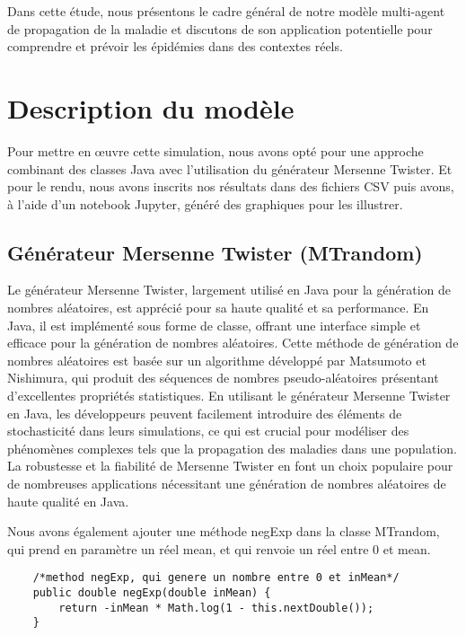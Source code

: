 \documentclass[french]{article}
\begin{document}
Dans cette étude, nous présentons le cadre général de notre modèle multi-agent de propagation de la maladie et discutons de son application potentielle pour comprendre et prévoir les épidémies dans des contextes réels.

\section{Description du modèle}

Pour mettre en œuvre cette simulation, nous avons opté pour une approche combinant des classes Java avec l'utilisation du générateur Mersenne Twister. Et pour le rendu, nous avons inscrits nos résultats dans des fichiers CSV puis avons, à l'aide d'un notebook Jupyter, généré des graphiques pour les illustrer.

\subsection{Générateur Mersenne Twister (MTrandom)}

Le générateur Mersenne Twister, largement utilisé en Java pour la génération de nombres aléatoires, est apprécié pour sa haute qualité et sa performance. En Java, il est implémenté sous forme de classe, offrant une interface simple et efficace pour la génération de nombres aléatoires. Cette méthode de génération de nombres aléatoires est basée sur un algorithme développé par Matsumoto et Nishimura, qui produit des séquences de nombres pseudo-aléatoires présentant d'excellentes propriétés statistiques. En utilisant le générateur Mersenne Twister en Java, les développeurs peuvent facilement introduire des éléments de stochasticité dans leurs simulations, ce qui est crucial pour modéliser des phénomènes complexes tels que la propagation des maladies dans une population. La robustesse et la fiabilité de Mersenne Twister en font un choix populaire pour de nombreuses applications nécessitant une génération de nombres aléatoires de haute qualité en Java.

Nous avons également ajouter une méthode negExp dans la classe MTrandom, qui prend en paramètre un réel mean, et qui renvoie un réel entre 0 et mean.

\begin{lstlisting}
	/*method negExp, qui genere un nombre entre 0 et inMean*/
	public double negExp(double inMean) {
        return -inMean * Math.log(1 - this.nextDouble());
    }
\end{lstlisting} 
\end{document}
